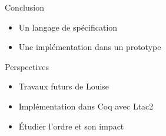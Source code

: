 \documentclass[french,usepdftitle=false,compress]{beamer}
\begin{document}
\begin{frame}
  \begin{block}{Conclusion}
    \begin{itemize}
      \item Un langage de spécification
      \item Une implémentation dans un prototype
    \end{itemize}
  \end{block}

  \begin{block}{Perspectives}
    \begin{itemize}
      \item Travaux futurs de Louise
      \item Implémentation dans Coq avec Ltac2
      \item Étudier l'ordre et son impact
    \end{itemize}
  \end{block}
\end{frame}
\end{document}
